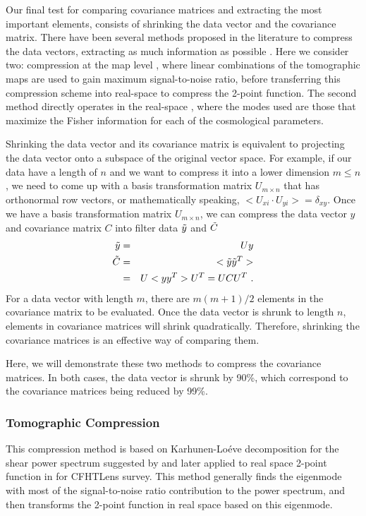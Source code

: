 \documentclass[twocolumn]{\docclass}
\def\bea{\begin{eqnarray}}
\def\eea{\end{eqnarray}}
\begin{document}
	Our final test for comparing covariance matrices and extracting the most important elements, consists of shrinking the data vector and the covariance matrix. There have been several methods proposed in the literature to compress the data vectors, extracting as much information as possible \citep{Tegmark:1997maa, Joachimi:2017mnr,Gualdi:2018gmj}. Here we consider two: compression at the map level \citep{Alonso:2017hhj}, where linear combinations of the tomographic maps are used to gain maximum signal-to-noise ratio, before transferring this compression scheme into real-space to compress the 2-point function. The second method directly operates in the real-space \citep{Zablocki:2015zcm}, where the modes used are those that maximize the Fisher information for each of the cosmological parameters.
	
	Shrinking the data vector and its covariance matrix is equivalent to projecting the data vector onto a subspace of the original vector space. For example, if our data have a length of $n$ and we want to compress it into a lower dimension $m\leq n$, we need to come up with a basis transformation matrix $U_{m\times n}$ that has orthonormal row vectors, or mathematically speaking, $<U_{xi} \cdot U_{yi}>=\delta_{xy}$. Once we have a basis transformation matrix $U_{m\times n}$, we can compress the data vector $y$ and covariance matrix $C$ into filter data $\Tilde{y}$ and $\Tilde{C}$
	\bea
	\Tilde{y} &=& U y\\\nonumber
	\Tilde{C} &=&<\Tilde{y}  \Tilde{y}^T>\\
	&=&U<y y^T> U^T= U C U^T\
	.\eea
	For a data vector with length $m$, there are $m(m+1)/2$ elements in the covariance matrix to be evaluated. Once the data vector is shrunk to length $n$, elements in covariance matrices will shrink quadratically. Therefore, shrinking the covariance matrices is an effective way of comparing them.
	
	Here, we will demonstrate these two methods to compress the covariance matrices. In both cases, the data vector is shrunk by 90\%, which correspond to the covariance matrices being reduced by 99\%. 
	
	\subsubsection{Tomographic Compression}
	
	This compression method is based on Karhunen-Lo\'eve decomposition for the shear power spectrum suggested by \citep{Alonso:2017hhj} and later applied to real space 2-point function in \citep{Bellini:2019ssw} for CFHTLens survey. This method generally finds the eigenmode with most of the signal-to-noise ratio contribution to the power spectrum, and then transforms the 2-point function in real space based on this eigenmode.
	
\end{document}
